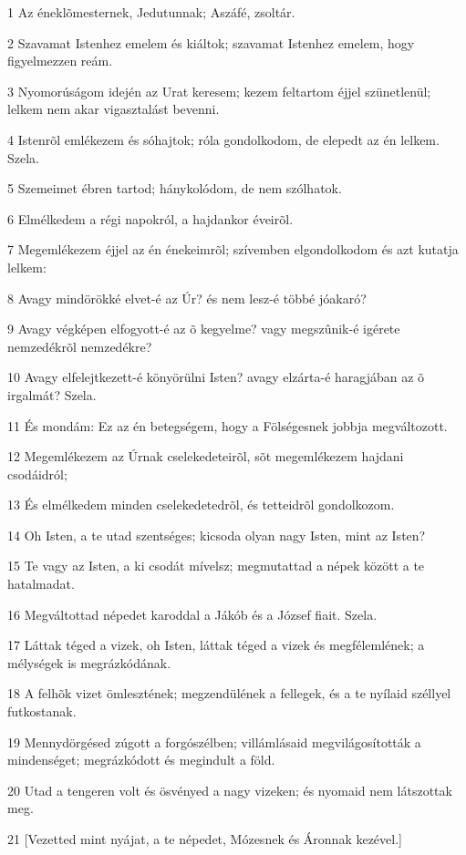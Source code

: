 \par 1 Az éneklõmesternek, Jedutunnak; Aszáfé, zsoltár.
\par 2 Szavamat Istenhez emelem és kiáltok; szavamat Istenhez emelem, hogy figyelmezzen reám.
\par 3 Nyomorúságom idején az Urat keresem; kezem feltartom éjjel szünetlenül; lelkem nem akar vigasztalást bevenni.
\par 4 Istenrõl emlékezem és sóhajtok; róla gondolkodom, de elepedt az én lelkem. Szela.
\par 5 Szemeimet ébren tartod; hánykolódom, de nem szólhatok.
\par 6 Elmélkedem a régi napokról, a hajdankor éveirõl.
\par 7 Megemlékezem éjjel az én énekeimrõl; szívemben elgondolkodom és azt kutatja lelkem:
\par 8 Avagy mindörökké elvet-é az Úr? és nem lesz-é többé jóakaró?
\par 9 Avagy végképen elfogyott-é az õ kegyelme? vagy megszûnik-é igérete nemzedékrõl nemzedékre?
\par 10 Avagy elfelejtkezett-é könyörülni Isten? avagy elzárta-é haragjában az õ irgalmát? Szela.
\par 11 És mondám: Ez az én betegségem, hogy a Fölségesnek jobbja megváltozott.
\par 12 Megemlékezem az Úrnak cselekedeteirõl, sõt megemlékezem hajdani csodáidról;
\par 13 És elmélkedem minden cselekedetedrõl, és tetteidrõl gondolkozom.
\par 14 Oh Isten, a te utad szentséges; kicsoda olyan nagy Isten, mint az Isten?
\par 15 Te vagy az Isten, a ki csodát mívelsz; megmutattad a népek között a te hatalmadat.
\par 16 Megváltottad népedet karoddal a Jákób és a József fiait. Szela.
\par 17 Láttak téged a vizek, oh Isten, láttak téged a vizek és megfélemlének; a mélységek is megrázkódának.
\par 18 A felhõk vizet ömlesztének; megzendülének a fellegek, és a te nyílaid széllyel futkostanak.
\par 19 Mennydörgésed zúgott a forgószélben; villámlásaid megvilágosították a mindenséget; megrázkódott és megindult a föld.
\par 20 Utad a tengeren volt és ösvényed a nagy vizeken; és nyomaid nem látszottak meg.
\par 21 [Vezetted mint nyájat, a te népedet, Mózesnek és Áronnak kezével.]

